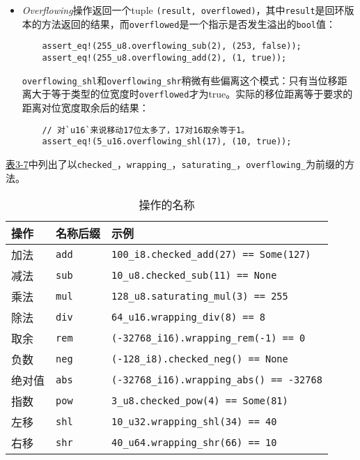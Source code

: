 \begin{itemize}
    \item \emph{Overflowing}操作返回一个tuple \texttt{(result, overflowed)}，其中\texttt{result}是回环版本的方法返回的结果，而\texttt{overflowed}是一个指示是否发生溢出的\texttt{bool}值：
    \begin{verbatim}
    assert_eq!(255_u8.overflowing_sub(2), (253, false));
    assert_eq!(255_u8.overflowing_add(2), (1, true));
    \end{verbatim}
    \texttt{overflowing\_shl}和\texttt{overflowing\_shr}稍微有些偏离这个模式：只有当位移距离大于等于类型的位宽度时\texttt{overflowed}才为true。实际的移位距离等于要求的距离对位宽度取余后的结果：
    \begin{verbatim}
    // 对`u16`来说移动17位太多了，17对16取余等于1。
    assert_eq!(5_u16.overflowing_shl(17), (10, true));
    \end{verbatim}
\end{itemize}

\hyperref[t3-7]{表3-7}中列出了以\texttt{checked\_}，\texttt{wrapping\_}，\texttt{saturating\_}，\texttt{overflowing\_}为前缀的方法。
\begin{table}[htbp]
    \centering
    \caption{操作的名称}
    \label{t3-7}
    \begin{tabular}{lll}
        \hline
        \textbf{操作}   & \textbf{名称后缀} &   示例 \\
        \hline
        加法    &   \texttt{add}    & \texttt{100\_i8.checked\_add(27) == Some(127)}    \\
        \rowcolor{tablecolor}
        减法    &   \texttt{sub}    & \texttt{10\_u8.checked\_sub(11) == None}      \\
        乘法    &   \texttt{mul}    & \texttt{128\_u8.saturating\_mul(3) == 255}    \\
        \rowcolor{tablecolor}
        除法    &   \texttt{div}    & \texttt{64\_u16.wrapping\_div(8) == 8}    \\
        取余    &   \texttt{rem}    & \texttt{(-32768\_i16).wrapping\_rem(-1) == 0} \\
        \rowcolor{tablecolor}
        负数    &   \texttt{neg}    & \texttt{(-128\_i8).checked\_neg() == None} \\
        绝对值  &   \texttt{abs}    & \texttt{(-32768\_i16).wrapping\_abs() == -32768} \\
        \rowcolor{tablecolor}
        指数    &   \texttt{pow}    & \texttt{3\_u8.checked\_pow(4) == Some(81)} \\
        左移    &   \texttt{shl}    & \texttt{10\_u32.wrapping\_shl(34) == 40}  \\
        \rowcolor{tablecolor}
        右移    &   \texttt{shr}    & \texttt{40\_u64.wrapping\_shr(66) == 10}  \\
    \end{tabular}
\end{table}

